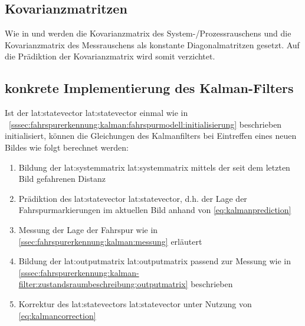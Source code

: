 \subsection{Kovarianzmatritzen}
Wie in \autocite{petersfalkoFPGAbasierteBildverarbeitungspipelineZur2009} und \autocite{risackRobustLaneRecognition} werden die Kovarianzmatrix des System-/Prozessrauschens  und die Kovarianzmatrix des Messrauschens  als konstante Diagonalmatritzen gesetzt. Auf die Prädiktion der Kovarianzmatrix  wird somit verzichtet.

\subsection{konkrete Implementierung des Kalman-Filters}
Ist der \glsdesc{lat:statevector} \gls{lat:statevector} einmal wie in ~\ref{sssec:fahrspurerkennung:kalman:fahrspurmodell:initialisierung} beschrieben initialisiert, können die Gleichungen des Kalmanfilters bei Eintreffen eines neuen Bildes wie folgt berechnet werden:
\begin{enumerate}
\item Bildung der \glsdesc{lat:systemmatrix} \gls{lat:systemmatrix} mittels der seit dem letzten Bild gefahrenen Distanz 
\item Prädiktion des \glsdesc{lat:statevector} \gls{lat:statevector}, d.h. der Lage der Fahrspurmarkierungen im aktuellen Bild anhand von \eqref{eq:kalmanprediction}
\item Messung der Lage der Fahrspur wie in \ref{ssec:fahrspurerkennung:kalman:messung}
erläutert
\item Bildung der \glsdesc{lat:outputmatrix} \gls{lat:outputmatrix} passend zur Messung wie in \ref{sssec:fahrspurerkennung:kalman-filter:zustandsraumbeschreibung:outputmatrix} beschrieben
\item Korrektur des \glsdesc{lat:statevector}s \gls{lat:statevector} unter Nutzung von \eqref{eq:kalmancorrection}
\end{enumerate}




